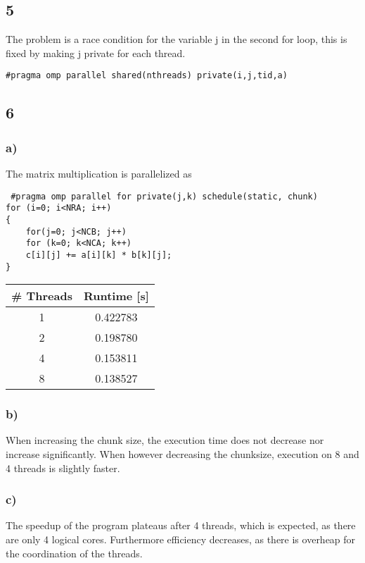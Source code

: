 \documentclass{article}
\begin{document}
\subsection{5}
The problem is a race condition for the variable j in the second for loop, this is fixed by making j private for each thread.
\begin{lstlisting}
#pragma omp parallel shared(nthreads) private(i,j,tid,a)
\end{lstlisting}

\subsection{6}
\subsubsection{a)}
The matrix multiplication is parallelized as
\begin{lstlisting}
 #pragma omp parallel for private(j,k) schedule(static, chunk)
for (i=0; i<NRA; i++)    
{
	for(j=0; j<NCB; j++)       
	for (k=0; k<NCA; k++)
	c[i][j] += a[i][k] * b[k][j];
}
\end{lstlisting}

\begin{center}
	\begin{tabular}{c|c}
		\# Threads & Runtime [s] \\ \hline
		1&0.422783\\ \hline
		2&0.198780\\ \hline
		4&		0.153811\\ \hline
		8&		0.138527
	\end{tabular}
\end{center}

\subsubsection{b)}
When increasing the chunk size, the execution time does not decrease nor increase significantly. When however decreasing the chunksize, execution on 8 and 4 threads is slightly faster.

\subsubsection{c)}
The speedup of the program plateaus after 4 threads, which is expected, as there are only 4 logical cores. Furthermore efficiency decreases, as there is overheap for the coordination of the threads.
\end{document}
